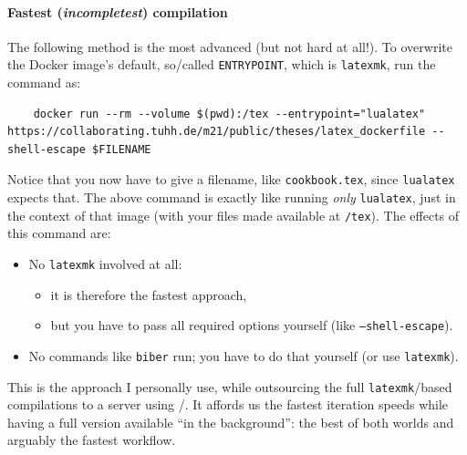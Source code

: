 \paragraph{Fastest (\emph{incompletest}) compilation}
The following method is the most advanced (but not hard at all!).
To overwrite the Docker image's default, so\-/called \texttt{ENTRYPOINT}, which is \texttt{latexmk}, run the command as:
\begin{verbatim}
    docker run --rm --volume $(pwd):/tex --entrypoint="lualatex" https://collaborating.tuhh.de/m21/public/theses/latex_dockerfile --shell-escape $FILENAME
\end{verbatim}
Notice that you now have to give a filename, like \texttt{cookbook.tex}, since \texttt{lualatex} expects that.
The above command is exactly like running \emph{only} \texttt{lualatex}, just in the context of that image (with your files made available at \texttt{/tex}).
The effects of this command are:
\begin{itemize}
  \item No \texttt{latexmk} involved at all:
        \begin{itemize}
          \item it is therefore the fastest approach,
          \item but you have to pass all required options yourself (like \texttt{--shell-escape}).
        \end{itemize}
  \item No commands like \texttt{biber} run; you have to do that yourself (or use \texttt{latexmk}).
\end{itemize}
This is the approach I personally use, while outsourcing the full \texttt{latexmk}\-/based compilations to a server using /.
It affords us the fastest iteration speeds while having a full version available \enquote{in the background}: the best of both worlds and arguably the fastest workflow.

